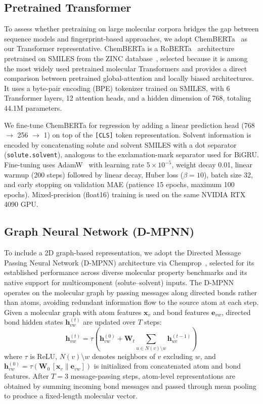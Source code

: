 \documentclass[journal=jcisd8,manuscript=article]{achemso}
\newcommand{\vect}[1]{\mathbf{#1}}
\newcommand{\matr}[1]{\mathbf{#1}}
\begin{document}
\FloatBarrier
\subsection{Pretrained Transformer}
\label{sec:chemberta}

To assess whether pretraining on large molecular corpora bridges the gap between sequence models and fingerprint-based approaches, we adopt ChemBERTa~\cite{chithrananda2020chemberta} as our Transformer representative.
ChemBERTa is a RoBERTa~\cite{liu2019roberta} architecture pretrained on SMILES from the ZINC database~\cite{irwin2005zinc}, selected because it is among the most widely used pretrained molecular Transformers and provides a direct comparison between pretrained global-attention and locally biased architectures.
It uses a byte-pair encoding (BPE) tokenizer trained on SMILES, with 6 Transformer layers, 12 attention heads, and a hidden dimension of 768, totaling 44.1M parameters.

We fine-tune ChemBERTa for regression by adding a linear prediction head (768 $\to$ 256 $\to$ 1) on top of the \texttt{[CLS]} token representation.
Solvent information is encoded by concatenating solute and solvent SMILES with a dot separator (\texttt{solute.solvent}), analogous to the exclamation-mark separator used for BiGRU.
Fine-tuning uses AdamW~\cite{loshchilov2019decoupled} with learning rate $5 \times 10^{-5}$, weight decay 0.01, linear warmup (200 steps) followed by linear decay, Huber loss ($\beta = 10$), batch size 32, and early stopping on validation MAE (patience 15 epochs, maximum 100 epochs).
Mixed-precision (float16) training is used on the same NVIDIA RTX 4090 GPU.


\subsection{Graph Neural Network (D-MPNN)}
\label{sec:chemprop}

To include a 2D graph-based representation, we adopt the Directed Message Passing Neural Network (D-MPNN) architecture via Chemprop~\cite{yangAnalyzingLearnedMolecular2019}, selected for its established performance across diverse molecular property benchmarks and its native support for multicomponent (solute--solvent) inputs.
The D-MPNN operates on the molecular graph by passing messages along directed bonds rather than atoms, avoiding redundant information flow to the source atom at each step.
Given a molecular graph with atom features $\vect{x}_v$ and bond features $\vect{e}_{vw}$, directed bond hidden states $\vect{h}_{vw}^{(t)}$ are updated over $T$ steps:
\begin{equation}
    \vect{h}_{vw}^{(t)} = \tau\!\left(\vect{h}_{vw}^{(0)} + \matr{W}_t \sum_{u \in N(v) \setminus w} \vect{h}_{uv}^{(t-1)}\right)
\end{equation}
where $\tau$ is ReLU, $N(v) \setminus w$ denotes neighbors of $v$ excluding $w$, and $\vect{h}_{vw}^{(0)} = \tau(\matr{W}_0 \, [\vect{x}_v \| \vect{e}_{vw}])$ is initialized from concatenated atom and bond features.
After $T = 3$ message-passing steps, atom-level representations are obtained by summing incoming bond messages and passed through mean pooling to produce a fixed-length molecular vector.
\end{document}
